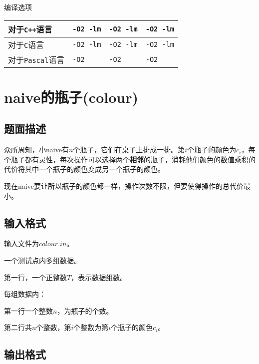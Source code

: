 \documentclass{ctexart}
\begin{document}
编译选项
\begin{table}[hb]
	\begin{center}
		\begin{tabular}{|p{3.37cm}|p{3.37cm}|p{3.37cm}|p{3.37cm}|}
			\hline
			对于\texttt{C++}语言 & \texttt{-O2 -lm} & \texttt{-O2 -lm} & \texttt{-O2 -lm} \\
			\hline
			对于\texttt{C}语言 & \texttt{-O2 -lm} & \texttt{-O2 -lm} & \texttt{-O2 -lm} \\
			\hline
			对于\texttt{Pascal}语言 & \texttt{-O2}    & \texttt{-O2}    & \texttt{-O2}     \\
			\hline
		\end{tabular}
	\end{center}
\end{table}



\newpage

\section{naive的瓶子(colour)}

\subsection{题面描述}

众所周知，小naive有$n$个瓶子，它们在桌子上排成一排。第$i$个瓶子的颜色为$c_i$，每个瓶子都有灵性，每次操作可以选择两个\textbf{相邻}的瓶子，消耗他们颜色的数值乘积的代价将其中一个瓶子的颜色变成另一个瓶子的颜色。 \par
现在naive要让所以瓶子的颜色都一样，操作次数不限，但要使得操作的总代价最小。 \par

\subsection{输入格式}

输入文件为$colour.in$。 \par
一个测试点内多组数据。 \par
第一行，一个正整数$T$，表示数据组数。 \par
每组数据内： \par
第一行一个整数$n$，为瓶子的个数。 \par
第二行共$n$个整数，第$i$个整数为第$i$个瓶子的颜色$c_i$。 \par

\subsection{输出格式}
\end{document}

